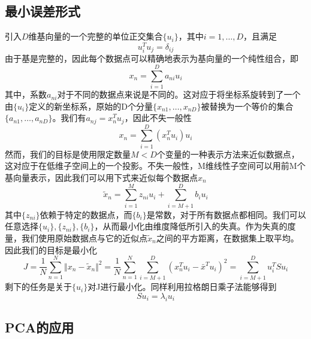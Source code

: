 \subsection*{最小误差形式}
引入$D$维基向量的一个完整的单位正交集合$\{u_i\}$，其中$i=1,\dots,D$，且满足 
\begin{equation}
	u_i^Tu_j=\delta_{ij}
\end{equation}
由于基是完整的，因此每个数据点可以精确地表示为基向量的一个纯性组合，即
\begin{equation}
	x_n=\sum_{i=1}^{D}a_{ni}u_i
\end{equation}
其中，系数$a_{ni}$对于不同的数据点来说是不同的。这对应于将坐标系旋转到了一个由$\{u_i\}$定义的新坐标系，原始的D个分量$\{x_{n1},\dots,x_{nD}\}$被替换为一个等价的集合$\{a_{n1},\dots,a_{nD}\}$。我们有$a_{nj}=x_n^Tu_j$，因此不失一般性
\begin{equation}
	x_n=\sum_{i=1}^{D}(x_n^Tu_i)u_i
\end{equation}
然而，我们的目标是使用限定数量$M<D$个变量的一种表示方法来近似数据点，这对应于在低维子空间上的一个投影。不失一般性，M维线性子空间可以用前M个基向量表示，因此我们可以用下式来近似每个数据点$x_n$
\begin{equation}
	\widetilde{x}_n=\sum_{i=1}^{M}z_{ni}u_i+\sum_{i=M+1}^{D}b_iu_i
\end{equation}
其中$\{z_{ni}\}$依赖于特定的数据点，而$\{b_i\}$是常数，对于所有数据点都相同。我们可以任意选择$\{u_i\},\{z_{ni}\},\{b_i\}$，从而最小化由维度降低所引入的失真。作为失真的度量，我们使用原始数据点与它的近似点$\widetilde{x}_n$之间的平方距离，在数据集上取平均。因此我们的目标是最小化
\begin{equation}
	J=\frac{1}{N}\sum_{n=1}^{N}\Vert x_n -\widetilde{x}_n \Vert^2=\frac{1}{N}\sum_{n=1}^{N}\sum_{i=M+1}^{D}(x_n^Tu_i-\bar{x}^Tu_i)^2=\sum_{i=M+1}^{D}u_i^TSu_i
\end{equation}
剩下的任务是关于$\{u_i\}$对J进行最小化。同样利用拉格朗日乘子法能够得到 
\begin{equation}
	Su_i=\lambda_iu_i
\end{equation}
\subsection*{PCA的应用}